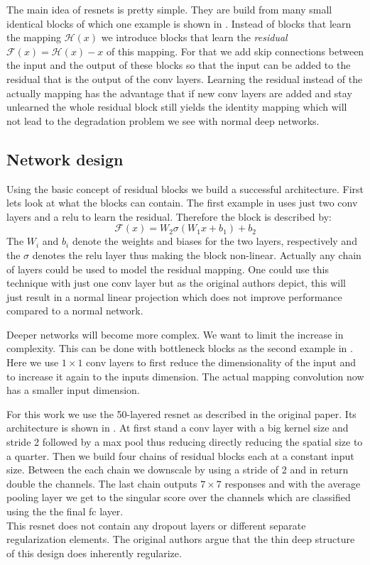 The main idea of \glspl{resnet} is pretty simple. They are build from many small identical blocks of which one example is shown in . Instead of blocks that learn the mapping $\mathcal{H}(x)$ we introduce blocks that learn the \textit{residual} $\mathcal{F}(x) = \mathcal{H}(x) - x$ of this mapping. For that we add skip connections between the input and the output of these blocks so that the input can be added to the residual that is the output of the \gls{conv} layers. Learning the residual instead of the actually mapping has the advantage that if new \gls{conv} layers are added and stay unlearned the whole residual block still yields the identity mapping which will not lead to the degradation problem we see with normal deep networks.

\subsection{Network design}
\label{sec:concepts:resnet:design}
Using the basic concept of residual blocks we build a successful architecture. First lets look at what the blocks can contain. The first example in  uses just two \gls{conv} layers and a \gls{relu} to learn the residual. Therefore the block is described by:
\begin{equation}
    \mathcal{F}(x) = W_2\sigma(W_1 x + b_1) + b_2
\end{equation}
The $W_i$ and $b_i$ denote the weights and biases for the two layers, respectively and the $\sigma$ denotes the \gls{relu} layer thus making the block non-linear. Actually any chain of layers could be used to model the residual mapping. One could use this technique with just one \gls{conv} layer but as the original authors \citep{he_deep_2016} depict, this will just result in a normal linear projection which does not improve performance compared to a normal network.

Deeper networks will become more complex. We want to limit the increase in complexity. This can be done with bottleneck blocks as the second example in . Here we use $1\times1$ \gls{conv} layers to first reduce the dimensionality of the input and to increase it again to the inputs dimension. The actual mapping convolution now has a smaller input dimension.

For this work we use the 50-layered \gls{resnet} as described in the original paper. Its architecture is shown in . At first stand a \gls{conv} layer with a big kernel size and stride 2 followed by a max pool thus reducing directly reducing the spatial size to a quarter. Then we build four chains of residual blocks each at a constant input size. Between the each chain we downscale by using a stride of 2 and in return double the channels. The last chain outputs $7 \times 7$ responses and with the average pooling layer we get to the singular score over the channels which are classified using the the final \gls{fc} layer.\\
This \gls{resnet} does not contain any dropout layers or different separate regularization elements. The original authors argue that the thin deep structure of this design does inherently regularize.


